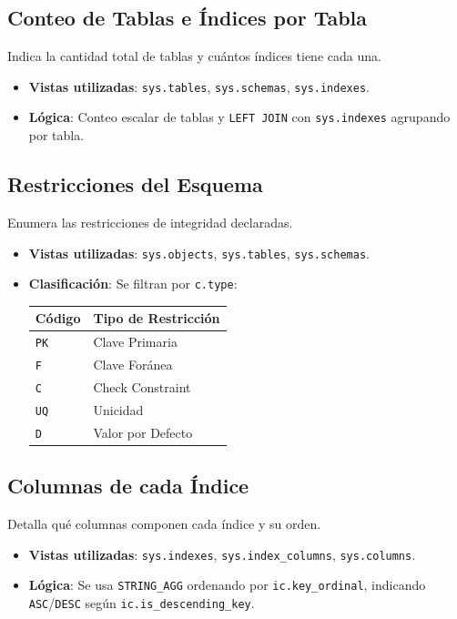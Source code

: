 \documentclass[11pt,a4paper]{article}
\begin{document}
\subsection{Conteo de Tablas e Índices por Tabla}
Indica la cantidad total de tablas y cuántos índices tiene cada una.
\begin{itemize}
    \item \textbf{Vistas utilizadas}: \texttt{sys.tables}, \texttt{sys.schemas}, \texttt{sys.indexes}.
    \item \textbf{Lógica}: Conteo escalar de tablas y \texttt{LEFT JOIN} con \texttt{sys.indexes} agrupando por tabla.
\end{itemize}

\subsection{Restricciones del Esquema}
Enumera las restricciones de integridad declaradas.
\begin{itemize}
    \item \textbf{Vistas utilizadas}: \texttt{sys.objects}, \texttt{sys.tables}, \texttt{sys.schemas}.
    \item \textbf{Clasificación}: Se filtran por \texttt{c.type}:
        \begin{center}
            \small
            \begin{tabular}{ll}
                \toprule
                \textbf{Código} & \textbf{Tipo de Restricción} \\
                \midrule
                \texttt{PK} & Clave Primaria \\
                \texttt{F}  & Clave Foránea \\
                \texttt{C}  & Check Constraint \\
                \texttt{UQ} & Unicidad \\
                \texttt{D}  & Valor por Defecto \\
                \bottomrule
            \end{tabular}
        \end{center}
\end{itemize}

\subsection{Columnas de cada Índice}
Detalla qué columnas componen cada índice y su orden.
\begin{itemize}
    \item \textbf{Vistas utilizadas}: \texttt{sys.indexes}, \texttt{sys.index\_columns}, \texttt{sys.columns}.
    \item \textbf{Lógica}: Se usa \texttt{STRING\_AGG} ordenando por \texttt{ic.key\_ordinal}, indicando \texttt{ASC}/\texttt{DESC} según \texttt{ic.is\_descending\_key}.
\end{itemize}
\end{document}
